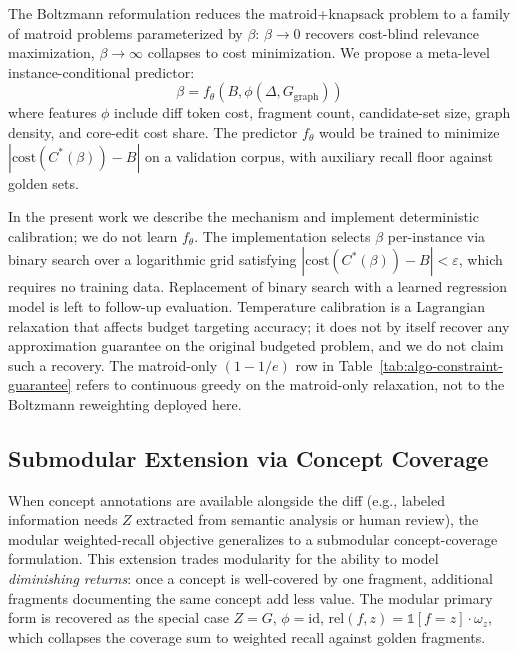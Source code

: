 \documentclass[11pt, a4paper]{article}
\providecommand{\mathbbm}[1]{\mathds{#1}}
\begin{document}
The Boltzmann reformulation reduces the matroid+knapsack problem to a family of matroid problems parameterized by $\beta$: $\beta \to 0$ recovers cost-blind relevance maximization, $\beta \to \infty$ collapses to cost minimization. We propose a meta-level instance-conditional predictor:
\begin{equation}
\beta = f_\theta(B, \phi(\Delta, G_{\mathrm{graph}}))
\end{equation}
where features $\phi$ include diff token cost, fragment count, candidate-set size, graph density, and core-edit cost share. The predictor $f_\theta$ would be trained to minimize $|\mathrm{cost}(C^*(\beta)) - B|$ on a validation corpus, with auxiliary recall floor against golden sets.

In the present work we describe the mechanism and implement deterministic calibration; we do not learn $f_\theta$. The implementation selects $\beta$ per-instance via binary search over a logarithmic grid satisfying $|\mathrm{cost}(C^*(\beta)) - B| < \varepsilon$, which requires no training data. Replacement of binary search with a learned regression model is left to follow-up evaluation. Temperature calibration is a Lagrangian relaxation that affects budget targeting accuracy; it does not by itself recover any approximation guarantee on the original budgeted problem, and we do not claim such a recovery. The matroid-only $(1-1/e)$ row in Table~\ref{tab:algo-constraint-guarantee} refers to continuous greedy on the matroid-only relaxation, not to the Boltzmann reweighting deployed here.

\subsection{Submodular Extension via Concept Coverage}
\label{sec:utility}

When concept annotations are available alongside the diff (e.g., labeled information needs $Z$ extracted from semantic analysis or human review), the modular weighted-recall objective generalizes to a submodular concept-coverage formulation. This extension trades modularity for the ability to model \emph{diminishing returns}: once a concept is well-covered by one fragment, additional fragments documenting the same concept add less value. The modular primary form is recovered as the special case $Z = G$, $\phi = \mathrm{id}$, $\mathrm{rel}(f, z) = \mathbbm{1}[f = z] \cdot \omega_z$, which collapses the coverage sum to weighted recall against golden fragments.
\end{document}
